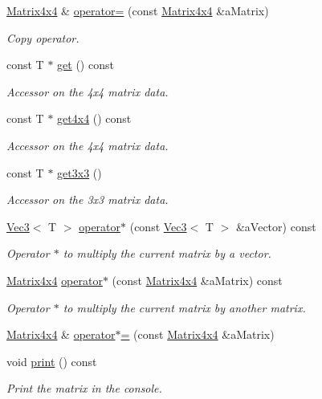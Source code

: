 \begin{DoxyCompactItemize}
\hyperlink{class_math_1_1_matrix4x4}{Matrix4x4} \& \hyperlink{class_math_1_1_matrix4x4_afe3cebfecf22cb768de5fe0cbfefa1c8}{operator=} (const \hyperlink{class_math_1_1_matrix4x4}{Matrix4x4} \&aMatrix)
\begin{DoxyCompactList}\small\item\em Copy operator. \end{DoxyCompactList}\item 
const T $\ast$ \hyperlink{class_math_1_1_matrix4x4_a66f520592447586b20c6e3c6c68fbf68}{get} () const 
\begin{DoxyCompactList}\small\item\em Accessor on the 4x4 matrix data. \end{DoxyCompactList}\item 
const T $\ast$ \hyperlink{class_math_1_1_matrix4x4_a12de3ab0dc9dbe52ae41a1ff2bec1c00}{get4x4} () const 
\begin{DoxyCompactList}\small\item\em Accessor on the 4x4 matrix data. \end{DoxyCompactList}\item 
const T $\ast$ \hyperlink{class_math_1_1_matrix4x4_af06f5ea0ddf0a32e59091ee4dc95a3bd}{get3x3} ()
\begin{DoxyCompactList}\small\item\em Accessor on the 3x3 matrix data. \end{DoxyCompactList}\item 
\hyperlink{class_math_1_1_vec3}{Vec3}$<$ T $>$ \hyperlink{class_math_1_1_matrix4x4_ac5b7e2977f4c67af7a9b800aa251683f}{operator$\ast$} (const \hyperlink{class_math_1_1_vec3}{Vec3}$<$ T $>$ \&aVector) const 
\begin{DoxyCompactList}\small\item\em Operator $\ast$ to multiply the current matrix by a vector. \end{DoxyCompactList}\item 
\hyperlink{class_math_1_1_matrix4x4}{Matrix4x4} \hyperlink{class_math_1_1_matrix4x4_a0d95dc8ee2eb0a743db3f8aa9ced74a2}{operator$\ast$} (const \hyperlink{class_math_1_1_matrix4x4}{Matrix4x4} \&aMatrix) const 
\begin{DoxyCompactList}\small\item\em Operator $\ast$ to multiply the current matrix by another matrix. \end{DoxyCompactList}\item 
\hyperlink{class_math_1_1_matrix4x4}{Matrix4x4} \& \hyperlink{class_math_1_1_matrix4x4_af1f3d9263afe1d91bf2a0446f38191ba}{operator$\ast$=} (const \hyperlink{class_math_1_1_matrix4x4}{Matrix4x4} \&aMatrix)
\item 
void \hyperlink{class_math_1_1_matrix4x4_a852b4402e2c907651dd734e7a4281b2f}{print} () const 
\begin{DoxyCompactList}\small\item\em Print the matrix in the console. \end{DoxyCompactList}\end{DoxyCompactItemize}
